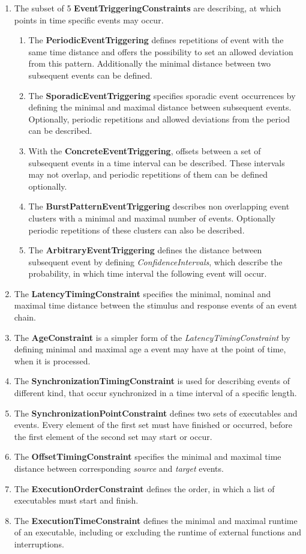 	\begin{enumerate}
		\item
			The subset of 5 \textbf{EventTriggeringConstraints} are describing, at which points in time specific events may occur.
			\begin{enumerate}[1]
				\item
					The \textbf{PeriodicEventTriggering} defines repetitions of event with the same time distance and offers the possibility to set an allowed deviation from this pattern. Additionally the minimal distance between two subsequent events can be defined.
				\item
					The \textbf{SporadicEventTriggering} specifies sporadic event occurrences by defining the minimal and maximal distance between subsequent events. Optionally, periodic repetitions and allowed deviations from the period can be described.
				\item
					With the \textbf{ConcreteEventTriggering}, offsets between a set of subsequent events in a time interval can be described. These intervals may not overlap, and periodic repetitions of them can be defined optionally.
				\item
					The \textbf{BurstPatternEventTriggering} describes non overlapping event clusters with a minimal and maximal number of events. Optionally periodic repetitions of these clusters can also be described.
				\item
					The \textbf{ArbitraryEventTriggering} defines the distance between subsequent event by defining \emph{ConfidenceIntervals}, which describe the probability, in which time interval the following event will occur.
			\end{enumerate}
		\item
			The \textbf{LatencyTimingConstraint} specifies the minimal, nominal and maximal time distance between the stimulus and response events of an event chain.
		\item
			The \textbf{AgeConstraint} is a simpler form of the \emph{LatencyTimingConstraint} by defining minimal and maximal age a event may have at the point of time, when it is processed.
		\item
			The \textbf{SynchronizationTimingConstraint} is used for describing events of different kind, that occur synchronized in a time interval of a specific length.
		\item
			The \textbf{SynchronizationPointConstraint} defines two sets of executables and events. Every element of the first set must have finished or occurred, before the first element of the second set may start or occur.
		\item
			The \textbf{OffsetTimingConstraint} specifies the minimal and maximal time distance between corresponding \emph{source} and \emph{target} events.
		\item
			The \textbf{ExecutionOrderConstraint} defines the order, in which a list of executables must start and finish.
		\item
			The \textbf{ExecutionTimeConstraint} defines the minimal and maximal runtime of an executable, including or excluding the runtime of external functions and interruptions.
	\end{enumerate}

